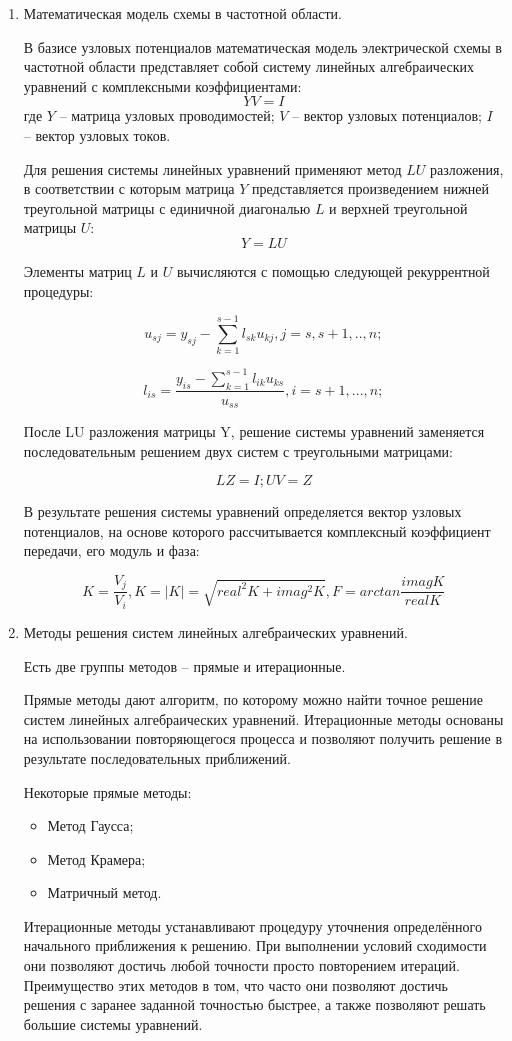 \documentclass[a4paper,14pt]{article}
\begin{document}
\begin{enumerate}
	\item Математическая модель схемы в частотной области.
	
	В базисе узловых потенциалов математическая модель электрической схемы в частотной области представляет собой систему линейных алгебраических уравнений с комплексными коэффициентами: 
	$$YV=I$$
	где $Y$ -- матрица узловых проводимостей; $V$ -- вектор узловых потенциалов; $I$ -- вектор узловых токов.
	
	Для решения системы линейных уравнений применяют метод $LU$ разложения, в соответствии с которым матрица $Y$ представляется произведением нижней треугольной матрицы с единичной диагональю $L$ и верхней треугольной матрицы $U$:
	$$Y=LU$$
	
	Элементы матриц $L$ и $U$ вычисляются с помощью следующей рекуррентной процедуры:
	
	$$u_{sj} = y_{sj} - \sum_{k=1}^{s-1} l_{sk} u_{kj}, j = s, s+1,..,n;$$
	
	$$l_{is} = \frac{y_{is} - \sum_{k=1}^{s-1} l_{ik} u_{ks}}{u_{ss}}, i = s+1,...,n;$$
	
	После LU разложения матрицы Y, решение системы уравнений заменяется последовательным решением двух систем с треугольными матрицами:
	
	$$ LZ = I; UV=Z$$ 
	
	В результате решения системы уравнений определяется вектор узловых потенциалов, на основе которого рассчитывается комплексный коэффициент передачи, его модуль и фаза:
	
	$$K = \frac{V_j}{V_i}, K = |K| = \sqrt{real^2 K + imag^2 K}, F = arctan \frac{imag K}{real K}$$
	
	\item Методы решения систем линейных алгебраических уравнений.
	
	Есть две группы методов -- прямые и итерационные. 
	
	Прямые методы дают алгоритм, по которому можно найти точное решение систем линейных алгебраических уравнений. Итерационные методы основаны на использовании повторяющегося процесса и позволяют получить решение в результате последовательных приближений.
	
	Некоторые прямые методы:
	
	\begin{itemize}
	\item Метод Гаусса;
	
	\item Метод Крамера;
	
	\item Матричный метод.
	\end{itemize}
	
	Итерационные методы устанавливают процедуру уточнения определённого начального приближения к решению. При выполнении условий сходимости они позволяют достичь любой точности просто повторением итераций. Преимущество этих методов в том, что часто они позволяют достичь решения с заранее заданной точностью быстрее, а также позволяют решать большие системы уравнений. 
	
	
\end{enumerate}
\end{document}
